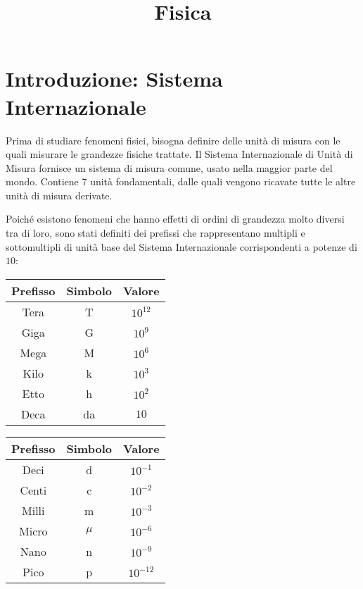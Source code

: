 \documentclass{article}
\title{Fisica}
\author{}
\date{}
\numberwithin{equation}{subsection}
\begin{document}
\maketitle

\clearpage

\tableofcontents

\clearpage

\section{Introduzione: Sistema Internazionale}

Prima di studiare fenomeni fisici, bisogna definire delle unità di misura con le quali misurare le grandezze fisiche trattate. Il Sistema Internazionale 
di Unità di Misura fornisce un sistema di misura comune, usato nella maggior parte del mondo. Contiene $7$ unità fondamentali, dalle quali vengono 
ricavate tutte le altre unità di misura derivate. 

Poiché esistono fenomeni che hanno effetti di ordini di grandezza molto diversi tra di loro, sono stati definiti dei prefissi che rappresentano multipli e sottomultipli di 
unità base del Sistema Internazionale corrispondenti a potenze di $10$:
\begin{center}
    \begin{tabular}{|c|c|c|}
        \hline
        Prefisso & Simbolo & Valore\\
        \hline
        Tera & T & $10^{12}$\\
        \hline
        Giga & G &$10^{9}$\\
        \hline
        Mega & M &$10^6$\\
        \hline
        Kilo & k & $10^3$\\
        \hline
        Etto & h & $10^2$\\
        \hline
        Deca & da & $10$\\
        \hline
    \end{tabular}
    \begin{tabular}{|c|c|c|}
        \hline
        Prefisso & Simbolo & Valore\\
        \hline
        Deci & d & $10^{-1}$\\
        \hline
        Centi & c &$10^{-2}$\\
        \hline
        Milli & m &$10^{-3}$\\
        \hline
        Micro &  $\mu$ & $10^{-6}$\\
        \hline
        Nano & n & $10^{-9}$\\
        \hline
        Pico & p & $10^{-12}$\\
        \hline
    \end{tabular}
\end{center}
\end{document}
